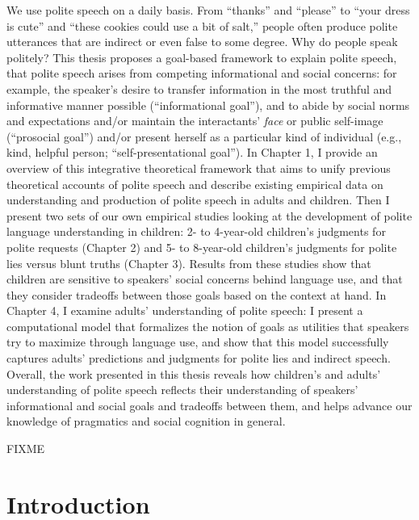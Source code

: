 \documentclass[oneside]{report}
\begin{document}
\beforepreface
{}
We use polite speech on a daily basis. From ``thanks'' and ``please'' to
``your dress is cute'' and ``these cookies could use a bit of salt,''
people often produce polite utterances that are indirect or even false
to some degree. Why do people speak politely? This thesis proposes a
goal-based framework to explain polite speech, that polite speech arises
from competing informational and social concerns: for example, the
speaker's desire to transfer information in the most truthful and
informative manner possible (``informational goal''), and to abide by
social norms and expectations and/or maintain the interactants'
\emph{face} or public self-image (``prosocial goal'') and/or present
herself as a particular kind of individual (e.g., kind, helpful person;
``self-presentational goal''). In Chapter 1, I provide an overview of
this integrative theoretical framework that aims to unify previous
theoretical accounts of polite speech and describe existing empirical
data on understanding and production of polite speech in adults and
children. Then I present two sets of our own empirical studies looking
at the development of polite language understanding in children: 2- to
4-year-old children's judgments for polite requests (Chapter 2) and 5-
to 8-year-old children's judgments for polite lies versus blunt truths
(Chapter 3). Results from these studies show that children are sensitive
to speakers' social concerns behind language use, and that they consider
tradeoffs between those goals based on the context at hand. In Chapter
4, I examine adults' understanding of polite speech: I present a
computational model that formalizes the notion of goals as utilities
that speakers try to maximize through language use, and show that this
model successfully captures adults' predictions and judgments for polite
lies and indirect speech. Overall, the work presented in this thesis
reveals how children's and adults' understanding of polite speech
reflects their understanding of speakers' informational and social goals
and tradeoffs between them, and helps advance our knowledge of
pragmatics and social cognition in general.

%
FIXME

\afterpreface


\chapter*{Introduction}\label{intro}
\end{document}

